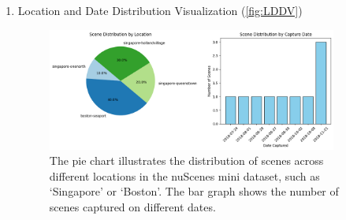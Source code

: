 \documentclass{article} %
\begin{document}
\begin{enumerate}
\begin{figure}[H]
		\end{figure}
		\item Location and Date Distribution Visualization (\autoref{fig:LDDV})
		\begin{figure}[H]
			\centering
			\includegraphics[width=0.9\textwidth]{Figures/Nuscenes_Location_and_Date_Distribution_Visualization.png}
			\caption{The pie chart illustrates the distribution of scenes across different locations in the nuScenes mini dataset, such as ‘Singapore’ or ‘Boston’. The bar graph shows the number of scenes captured on different dates.}
			\label{fig:LDDV}
		\end{figure}
		
		
		
	\end{enumerate}
\end{document}

